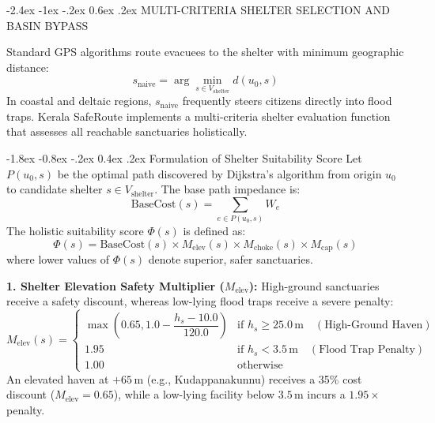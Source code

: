 \documentclass[12pt,oneside]{report}
\makeatletter
\renewcommand{\section}{\@startsection{section}{1}{\z@}%
  {-2.4ex \@plus -1ex \@minus -.2ex}%
  {0.6ex \@plus .2ex}%
  {\normalfont\large\bfseries}}
\renewcommand{\subsection}{\@startsection{subsection}{2}{\z@}%
  {-1.8ex \@plus -0.8ex \@minus -.2ex}%
  {0.4ex \@plus .2ex}%
  {\normalfont\normalsize\bfseries}}
\makeatother
\begin{document}
\section{MULTI-CRITERIA SHELTER SELECTION AND BASIN BYPASS}

Standard GPS algorithms route evacuees to the shelter with minimum geographic distance:
\begin{equation}
    s_{\text{naive}} = \arg\min_{s \in V_{\text{shelter}}} d(u_0, s)
\end{equation}
In coastal and deltaic regions, $s_{\text{naive}}$ frequently steers citizens directly into flood traps. Kerala SafeRoute implements a multi-criteria shelter evaluation function that assesses all reachable sanctuaries holistically.

\subsection{Formulation of Shelter Suitability Score}
Let $P(u_0, s)$ be the optimal path discovered by Dijkstra's algorithm from origin $u_0$ to candidate shelter $s \in V_{\text{shelter}}$. The base path impedance is:
\begin{equation}
    \text{BaseCost}(s) = \sum_{e \in P(u_0, s)} W_e
\end{equation}
The holistic suitability score $\Phi(s)$ is defined as:
\begin{equation}
    \boxed{\Phi(s) = \text{BaseCost}(s) \times M_{\text{elev}}(s) \times M_{\text{choke}}(s) \times M_{\text{cap}}(s)}
\end{equation}
where lower values of $\Phi(s)$ denote superior, safer sanctuaries.

\textbf{1. Shelter Elevation Safety Multiplier ($M_{\text{elev}}$):} High-ground sanctuaries receive a safety discount, whereas low-lying flood traps receive a severe penalty:
\begin{equation}
    M_{\text{elev}}(s) = \begin{cases}
    \max\left(0.65, 1.0 - \dfrac{h_s - 10.0}{120.0}\right) & \text{if } h_s \ge 25.0\,\text{m} \quad (\text{High-Ground Haven}) \\
    1.95 & \text{if } h_s < 3.5\,\text{m} \quad (\text{Flood Trap Penalty}) \\
    1.00 & \text{otherwise}
    \end{cases}
\end{equation}
An elevated haven at $+65$\,m (e.g., Kudappanakunnu) receives a 35\% cost discount ($M_{\text{elev}} = 0.65$), while a low-lying facility below $3.5$\,m incurs a $1.95\times$ penalty.
\end{document}
